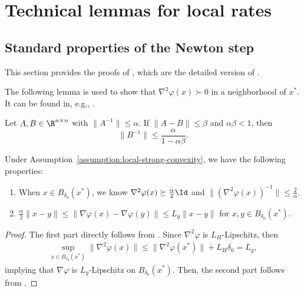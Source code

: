 
\section{Technical lemmas for local rates}


\subsection{Standard properties of the Newton step}
\label{sec:properties-of-newton-step}

This section provides the proofs of , which are the detailed version of .

The following lemma is used to show that $\nabla^2\varphi(x)\succ 0$ in a neighborhood of $x^*$. 
It can be found in, e.g., \citet[Lemma 7.2.12]{facchinei2003finite}.
\begin{lemma}
    \label{lem:perturbation-lemma}
    Let $A, B \in \R^{n \times n}$ with $\| A^{-1} \| \leq \alpha$. 
    If $\| A - B \| \leq \beta$ and $\alpha\beta < 1$, then 
    \begin{equation}
        \label{eqn:perturbation-lemma}
        \|B^{-1} \| \leq \frac{\alpha}{1 - \alpha\beta}.
    \end{equation}
\end{lemma}

\begin{corollary}
    \label{cor:perturbation-lemma}
    Under Assumption~\ref{assumption:local-strong-convexity}, we have the following properties:
    \begin{enumerate}
        \item When $x \in B_{\delta_0}(x^*)$, we know $\nabla^2\varphi(x) \succeq \frac{\alpha}{2} \Id$ and $\| (\nabla^2\varphi(x))^{-1} \| \leq \frac{2}{\alpha}$.
        \item $\frac{\alpha}{2} \| x - y \| \leq \| \nabla \varphi(x) - \nabla \varphi(y) \| \leq L_g \| x - y \|$ for $x, y \in B_{\delta_0}(x^*)$.
    \end{enumerate}
\end{corollary}
\begin{proof}
    The first part directly follows from .
    Since $\nabla^2\varphi$ is $L_H$-Lipschitz, then 
    \begin{align*}
    \sup_{x \in B_{\delta_0}(x^*)} \| \nabla^2 \varphi(x) \| 
    \leq \| \nabla^2\varphi(x^*) \| + L_H \delta_0 = L_g,
    \end{align*}
    implying that $\nabla \varphi$ is $L_g$-Lipschitz on $B_{\delta_0}(x^*)$.
    Then, the second part follows from \citet[Section 1]{nesterov2018lectures}.
\end{proof}

